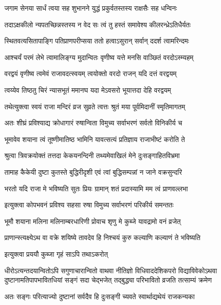 \twolineshloka
{जगाम सेनया सार्धं त्वया सह शुभानने}
{युद्धं प्रकुर्वतस्तस्य राक्षसैः सह धन्विनः} %

\twolineshloka
{तदाऽक्षकीलो न्यपतच्छिन्नस्तस्य न वेद सः}
{त्वं तु हस्तं समावेश्य कीलरन्ध्रेऽतिधैर्यतः} %

\twolineshloka
{स्थितवत्यसितापाङ्गि पतिप्राणपरीप्सया}
{ततो हत्वाऽसुरान् सर्वान् ददर्श त्वामरिन्दमः} %

\twolineshloka
{आश्चर्यं परमं लेभे त्वामालिङ्ग्य मुदान्वितः}
{वृणीष्व यत्ते मनसि वाञ्छितं वरदोऽस्म्यहम्} %

\twolineshloka
{वरद्वयं वृणीष्व त्वमेवं राजावदत्स्वयम्}
{त्वयोक्तो वरदो राजन् यदि दत्तं वरद्वयम्} %

\twolineshloka
{त्वय्येव तिष्ठतु चिरं न्यासभूतं ममानघ}
{यदा मेऽवसरो भूयात्तदा देहि वरद्वयम्} %

\twolineshloka
{तथेत्युक्त्वा स्वयं राजा मन्दिरं व्रज सुव्रते}
{त्वत्तः श्रुतं मया पूर्वमिदानीं स्मृतिमागतम्} %

\twolineshloka
{अतः शीघ्रं प्रविश्याद्य क्रोधागारं रुषान्विता}
{विमुच्य सर्वाभरणं सर्वतो विनिकीर्य च} %

\twolineshloka
{भूमावेव शयाना त्वं तूष्णीमातिष्ठ भामिनि}
{यावत्सत्यं प्रतिज्ञाय राजाभीष्टं करोति ते} %

\twolineshloka
{श्रुत्वा त्रिवक्रयोक्तं तत्तदा केकयनन्दिनी}
{तथ्यमेवाखिलं मेने दुःसङ्गाहितविभ्रमा} %

\twolineshloka
{तामाह कैकेयी दुष्टा कुतस्ते बुद्धिरीदृशी}
{एवं त्वां बुद्धिसम्पन्नां न जाने वक्रसुन्दरि} %

\twolineshloka
{भरतो यदि राजा मे भविष्यति सुतः प्रियः}
{ग्रामान् शतं प्रदास्यामि मम त्वं प्राणवल्लभा} %

\twolineshloka
{इत्युक्त्वा कोपभवनं प्रविश्य सहसा रुषा}
{विमुच्य सर्वाभरणं परिकीर्य समन्ततः} %

\twolineshloka
{भूमौ शयाना मलिना मलिनाम्बरधारिणी}
{प्रोवाच शृणु मे कुब्जे यावद्रामो वनं व्रजेत्} %

\twolineshloka
{प्राणान्स्त्यक्ष्येऽथ वा वक्रे शयिष्ये तावदेव हि}
{निश्चयं कुरु कल्याणि कल्याणं ते भविष्यति} %

\onelineshloka
{इत्युक्त्वा प्रययौ कुब्जा गृहं साऽपि तथाऽकरोत्} %


\fourlineindentedshloka
{धीरोऽत्यन्तदयान्वितोऽपि सगुणाचारान्वितो वाथवा}
{नीतिज्ञो विधिवाददेशिकपरो विद्याविवेकोऽथवा}
{दुष्टानामतिपापभावितधियां सङ्गं सदा चेद्भजेत्}
{तद्बुद्ध्या परिभावितो व्रजति तत्साम्यं क्रमेण} %

\twolineshloka
{अतः सङ्गः परित्याज्यो दुष्टानां सर्वदैव हि}
{दुःसङ्गी च्यवते स्वार्थाद्यथेयं राजकन्यका} %

